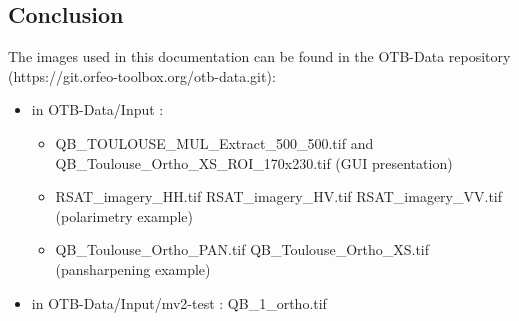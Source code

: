 \subsection{Conclusion}\label{ssec:moncon}
The images used in this documentation can be found in the OTB-Data repository (https://git.orfeo-toolbox.org/otb-data.git):
\begin{itemize}
\item in OTB-Data/Input : 
\begin{itemize}
\item QB\_TOULOUSE\_MUL\_Extract\_500\_500.tif and QB\_Toulouse\_Ortho\_XS\_ROI\_170x230.tif (GUI presentation)
\item RSAT\_imagery\_HH.tif RSAT\_imagery\_HV.tif RSAT\_imagery\_VV.tif (polarimetry example)
\item QB\_Toulouse\_Ortho\_PAN.tif QB\_Toulouse\_Ortho\_XS.tif (pansharpening example)
\end{itemize}

\item in OTB-Data/Input/mv2-test : QB\_1\_ortho.tif
\end{itemize}

